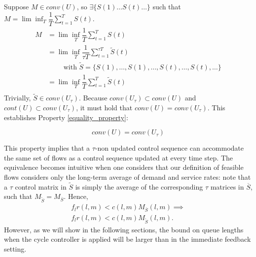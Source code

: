 \noindent Suppose $M \in conv(U)$, so $\exists \{ S(1) \ldots S(t) \ldots \}$ such that $M = \lim\inf_{T} \dfrac{1}{T}\sum_{t=1}^{T} S(t)$.
\begin{align*}
M &= \lim\inf_{T} \dfrac{1}{T}\sum_{t=1}^{T} S(t)\\
&= \lim\inf_{T} \dfrac{1}{\tau T}\sum_{t=1}^{\tau T}  \tilde{S}(t) \; \\ 
& \qquad \text{ with } \tilde{S} = \{S(1), \ldots, S(1), \ldots, S(t), \ldots, S(t), \ldots \} \\
&= \lim\inf_{T} \dfrac{1}{ T}\sum_{t=1}^{T}  \tilde{S}(t) \\
\end{align*}
Trivially, $\tilde{S }\in conv(U_\tau)$. Because $conv(U_{\tau})\subset conv(U)$ and $cont(U) \subset conv(U_{\tau})$, it must hold that $conv(U) = conv(U_{\tau})$.  This establishes Property \ref{equality_property}: 

\begin{Prop} \label{equality_property}
\begin{equation*} conv(U) = conv(U_{\tau}) \end{equation*}
\end{Prop}

This property implies that a $\tau$-non updated control sequence can accommodate the same set of flows as a control sequence updated at every time step. The equivalence becomes intuitive when one considers that our definition of feasible flows considers only the long-term average of demand and service rates: note that a $\tau$ control matrix in $\tilde S$ is simply the average of the corresponding $\tau$ matrices in $\overline S$, such that $M_{\tilde S} = M_{\overline S}$. Hence,
\begin{align}
f_{l} r(l,m) < c(l,m)M_{\overline{S} }(l,m) \implies \\ f_{l} r(l,m) < c(l,m)M_{\tilde{S} }(l,m). \nonumber
\end{align}
However, as we will show in the following sections, the bound on queue lengths when the cycle controller is applied will be larger than in the immediate feedback setting.


